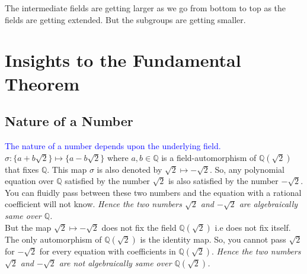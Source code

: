 \vspace{5mm}
\begin{remark}
  The intermediate fields are getting larger as we go from bottom to top as the fields are getting extended. But the subgroups are getting smaller.
\end{remark}

\vspace{7mm}
\section{Insights to the Fundamental Theorem}

\subsection{Nature of a Number}
\textcolor{blue}{The nature of a number depends upon the underlying field.} \\
\(\sigma:\{a+b\sqrt{2}\} \mapsto \{a-b\sqrt{2}\}\) where \(a,b \in \mathbb{Q}\) is a field-automorphism of  \(\mathbb{Q}(\sqrt{2})\) that fixes \(\mathbb{Q}\). This map \(\sigma \) is also denoted by \(\sqrt{2} \longmapsto -\sqrt{2}\). So, any polynomial equation over \(\mathbb{Q}\) satisfied by the number \(\sqrt{2}\) is also satisfied by the number \(-\sqrt{2}\). You can fluidly pass between these two numbers and the equation with a rational coefficient will not know. \textit{Hence the two numbers \(\sqrt{2}\) and \(-\sqrt{2}\) are algebraically same over \(\mathbb{Q}\).}\\

But the map \(\sqrt{2} \longmapsto -\sqrt{2}\) does not fix the field \(\mathbb{Q}(\sqrt{2})\) i.e does not fix itself. The only automorphism of \(\mathbb{Q}(\sqrt{2})\) is the identity map. So, you cannot pass \(\sqrt{2}\) for \(-\sqrt{2}\) for every equation with coefficients in \(\mathbb{Q}(\sqrt{2})\). \textit{Hence the two numbers \(\sqrt{2}\) and \(-\sqrt{2}\) are not algebraically same over \(\mathbb{Q}(\sqrt{2})\).}
\vspace{7mm}

\begin{figure}[h]
  \centering
    \end{figure}
\clearpage

